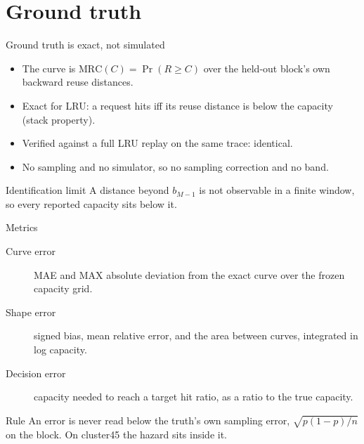 \section{Ground truth}

\begin{frame}{Ground truth is exact, not simulated}
  \begin{itemize}
    \item The curve is $\mathrm{MRC}(C) = \Pr(R \ge C)$ over the held-out
      block's own backward reuse distances.
    \item Exact for LRU: a request hits iff its reuse distance is below the
      capacity (stack property).
    \item Verified against a full LRU replay on the same trace: identical.
    \item No sampling and no simulator, so no sampling correction and no band.
  \end{itemize}
  \vspace{1em}
  \begin{block}{Identification limit}
    A distance beyond $b_{M-1}$ is not observable in a finite window, so every
    reported capacity sits below it.
  \end{block}
\end{frame}

\begin{frame}{Metrics}
  \begin{description}
    \item[Curve error] MAE and MAX absolute deviation from the exact curve
      over the frozen capacity grid.
    \item[Shape error] signed bias, mean relative error, and the area between
      curves, integrated in log capacity.
    \item[Decision error] capacity needed to reach a target hit ratio, as a
      ratio to the true capacity.
  \end{description}
  \vspace{0.6em}
  \begin{block}{Rule}
    An error is never read below the truth's own sampling error,
    $\sqrt{p(1-p)/n}$ on the block. On cluster45 the hazard sits inside it.
  \end{block}
\end{frame}
